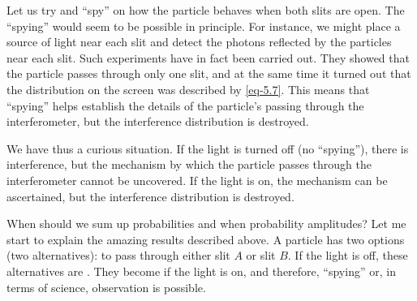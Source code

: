  Let us try and ``spy'' on
how the particle behaves when both slits are open. The ``spying'' would
seem to be possible in principle. For instance, we might place a source
of light near each slit and detect the photons reflected by the particles
near each slit. Such experiments have in fact been carried out. They
showed that the particle passes through only one slit, and at the same
time it turned out that the distribution on the screen was described by
\eqref{eq-5.7}. This means that ``spying'' helps establish the details of the particle's passing through the interferometer, but the interference distribution is destroyed.

We have thus a curious situation. If the light is turned off (no
``spying''), there is interference, but the mechanism by which the particle
passes through the interferometer cannot be uncovered. If the light is on,
the mechanism can be ascertained, but the interference distribution is destroyed.


When should we sum up probabilities and when probability amplitudes? Let me start to explain the amazing results described above. A particle has two options (two alternatives): to pass through either slit $A$ or slit $B$. If the light is off, these alternatives are . They become  if the light is on, and therefore, ``spying'' or, in terms of science, observation is possible.

